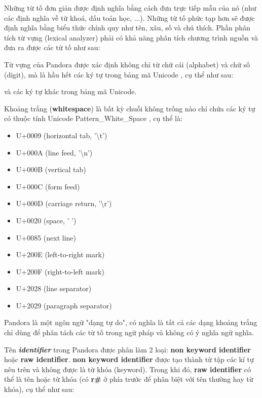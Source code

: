     Những từ tố đơn giản được định nghĩa bằng cách đưa trực tiếp mẫu của
nó (như các định nghĩa về từ khoá, dấu toán học, ...). Những từ tố phức tạp
hơn sẽ được định nghĩa bằng biểu thức chính quy như tên, xâu, số và chú thích.
Phần phân tích từ vựng (lexical analyzer) phải có khả năng phân tích chương trình nguồn
và đưa ra được các từ tố như sau:



    Từ vựng của Pandora được xác định không chỉ từ chữ cái (alphabet) và chữ số (digit), mà là hầu hết các ký tự trong bảng mã Unicode \cite{allen2012unicode}, cụ thể như sau:

    \regexdigit

    \regexalphabet

\noindent và các ký tự khác trong bảng mã Unicode.

    Khoảng trắng (\textbf{whitespace}) là bất kỳ chuỗi không trống nào chỉ chứa các ký tự có thuộc tính Unicode Pattern\_White\_Space \cite{web:unicode:report}, cụ thể là:
    \begin{itemize}
        \item{U+0009 (horizontal tab, '\textbackslash t')}
        \item{U+000A (line feed, '\textbackslash n')}
        \item{U+000B (vertical tab)}
        \item{U+000C (form feed)}
        \item{U+000D (carriage return, '\textbackslash r')}
        \item{U+0020 (space, ' ')}
        \item{U+0085 (next line)}
        \item{U+200E (left-to-right mark)}
        \item{U+200F (right-to-left mark)}
        \item{U+2028 (line separator)}
        \item{U+2029 (paragraph separator)}
    \end{itemize}
\noindent Pandora là một ngôn ngữ "dạng tự do", có nghĩa là tất cả các dạng khoảng trắng chỉ dùng để phân tách các từ tố trong ngữ pháp và không có ý nghĩa ngữ nghĩa.

    Tên \textbf{\textit{identifier}} trong Pandora được phân làm 2 loại: \textbf{non keyword identifier} hoặc \textbf{raw identifier}. \textbf{non keyword identifier} được tạo thành từ tập các kí tự nêu trên và không được là từ khóa (keyword). Trong khi đó, \textbf{raw identifier} có thể là tên hoặc từ khóa (có \textbf{r\#} ở phía trước để phân biệt với tên thường hay từ khóa), cụ thể như sau:

